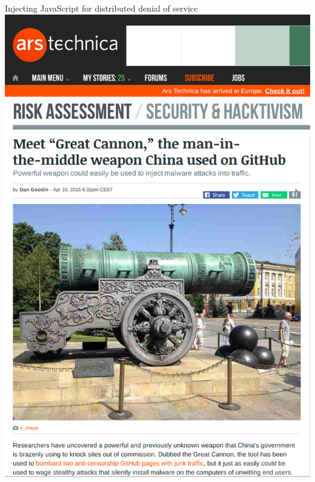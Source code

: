 \documentclass[11pt]{beamer}
\begin{document}
\begin{frame}{Injecting JavaScript for distributed denial of service}
\includegraphics[scale=0.2]{great_canon.png}
\end{frame}
\end{document}
